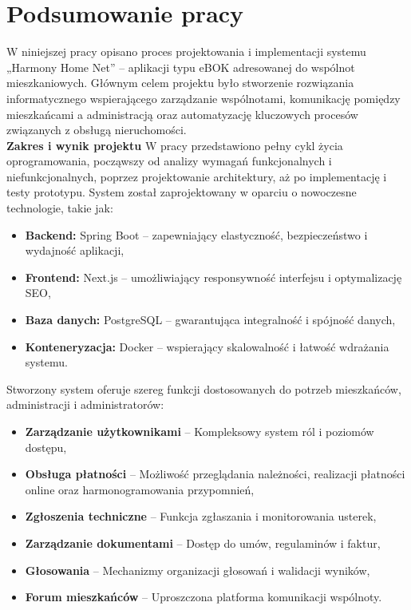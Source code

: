 \chapter{Podsumowanie pracy}

W niniejszej pracy opisano proces projektowania i implementacji systemu „Harmony Home Net” – aplikacji typu eBOK adresowanej do wspólnot mieszkaniowych. Głównym celem projektu było stworzenie rozwiązania informatycznego wspierającego zarządzanie wspólnotami, komunikację pomiędzy mieszkańcami a administracją oraz automatyzację kluczowych procesów związanych z obsługą nieruchomości. \\[-10pt]

\noindent\textbf{Zakres i wynik projektu}\newline
\noindent W pracy przedstawiono pełny cykl życia oprogramowania, począwszy od analizy wymagań funkcjonalnych i niefunkcjonalnych, poprzez projektowanie architektury, aż po implementację i testy prototypu. System został zaprojektowany w oparciu o nowoczesne technologie, takie jak:
\begin{itemize}
    \item \textbf{Backend:} Spring Boot -- zapewniający elastyczność, bezpieczeństwo i wydajność aplikacji,
    \item \textbf{Frontend:} Next.js -- umożliwiający responsywność interfejsu i optymalizację SEO,
    \item \textbf{Baza danych:} PostgreSQL -- gwarantująca integralność i spójność danych,
    \item \textbf{Konteneryzacja:} Docker -- wspierający skalowalność i łatwość wdrażania systemu.
\end{itemize}

Stworzony system oferuje szereg funkcji dostosowanych do potrzeb mieszkańców, administracji i administratorów:
\begin{itemize}
    \item \textbf{Zarządzanie użytkownikami} -- Kompleksowy system ról i poziomów dostępu,
    \item \textbf{Obsługa płatności} -- Możliwość przeglądania należności, realizacji płatności online oraz harmonogramowania przypomnień,
    \item \textbf{Zgłoszenia techniczne} -- Funkcja zgłaszania i monitorowania usterek,
    \item \textbf{Zarządzanie dokumentami} -- Dostęp do umów, regulaminów i faktur,
    \item \textbf{Głosowania} -- Mechanizmy organizacji głosowań i walidacji wyników,
    \item \textbf{Forum mieszkańców} -- Uproszczona platforma komunikacji wspólnoty.
\end{itemize}


